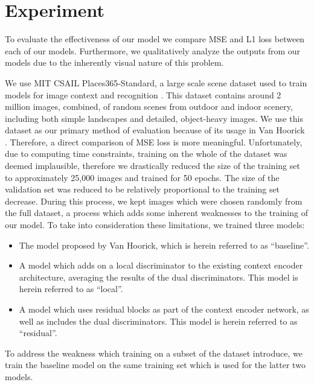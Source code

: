 \documentclass{article}
\begin{document}
\section{Experiment}
To evaluate the effectiveness of our model we compare MSE and L1 loss between each of our models. Furthermore, we qualitatively analyze the outputs from our models due to the inherently visual nature of this problem.

We use MIT CSAIL Places365-Standard, a large scale scene dataset used to train models for image context and recognition \citep{zhou_places_2017}. This dataset contains around 2 million images, combined, of random scenes from outdoor and indoor scenery, including both simple landscapes and detailed, object-heavy images. We use this dataset as our primary method of evaluation because of its usage in Van Hoorick \citep{van_hoorick_image_2020}. Therefore, a direct comparison of MSE loss is more meaningful. Unfortunately, due to computing time constraints, training on the whole of the dataset was deemed implausible, therefore we drastically reduced the size of the training set to approximately 25,000 images and trained for 50 epochs. The size of the validation set was reduced to be relatively proportional to the training set decrease. During this process, we kept images which were chosen randomly from the full dataset, a process which adds some inherent weaknesses to the training of our model. To take into consideration these limitations, we trained three models: 
\begin{itemize}
\setlength{\partopsep}{0pt}
\setlength{\topsep}{0pt}
\setlength{\itemsep}{0pt}
	\item{The model proposed by Van Hoorick, which is herein referred to as ``baseline''.}
	\item{A model which adds on a local discriminator to the existing context encoder architecture, averaging the results of the dual discriminators. This model is herein referred to as ``local''.}
	\item{A model which uses residual blocks as part of the context encoder network, as well as includes the dual discriminators. This model is herein referred to as ``residual''.}
\end{itemize}
To address the weakness which training on a subset of the dataset introduce, we train the baseline model on the same training set which is used for the latter two models.
\end{document}
